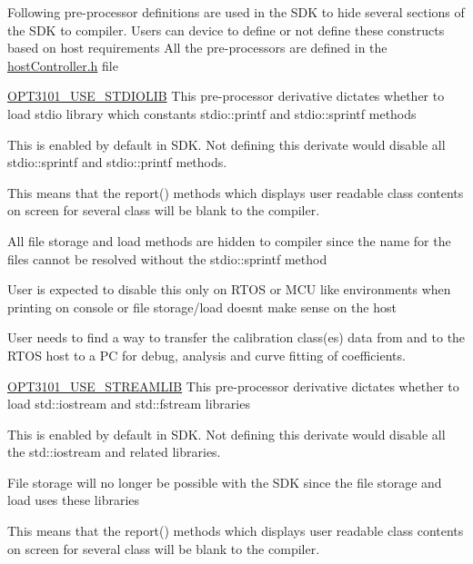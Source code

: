 Following pre-\/processor definitions are used in the S\+DK to hide several sections of the S\+DK to compiler. Users can device to define or not define these constructs based on host requirements All the pre-\/processors are defined in the \mbox{\hyperlink{host_controller_8h}{host\+Controller.\+h}} file
\begin{DoxyItemize}
\item \mbox{\hyperlink{host_controller_8h_a140baa610a82653550ea9aa0a85feb43}{O\+P\+T3101\+\_\+\+U\+S\+E\+\_\+\+S\+T\+D\+I\+O\+L\+IB}} This pre-\/processor derivative dictates whether to load stdio library which constants stdio\+::printf and stdio\+::sprintf methods
\begin{DoxyItemize}
\item This is enabled by default in S\+DK. Not defining this derivate would disable all stdio\+::sprintf and stdio\+::printf methods.
\item This means that the report() methods which displays user readable class contents on screen for several class will be blank to the compiler.
\item All file storage and load methods are hidden to compiler since the name for the files cannot be resolved without the stdio\+::sprintf method
\item User is expected to disable this only on R\+T\+OS or M\+CU like environments when printing on console or file storage/load doesn\textquotesingle{}t make sense on the host
\item User needs to find a way to transfer the calibration class(es) data from and to the R\+T\+OS host to a PC for debug, analysis and curve fitting of coefficients.
\end{DoxyItemize}
\item \mbox{\hyperlink{host_controller_8h_a3ca6673b36debd7f489557558d93fe38}{O\+P\+T3101\+\_\+\+U\+S\+E\+\_\+\+S\+T\+R\+E\+A\+M\+L\+IB}} This pre-\/processor derivative dictates whether to load std\+::iostream and std\+::fstream libraries
\begin{DoxyItemize}
\item This is enabled by default in S\+DK. Not defining this derivate would disable all the std\+::iostream and related libraries.
\item File storage will no longer be possible with the S\+DK since the file storage and load uses these libraries
\item This means that the report() methods which displays user readable class contents on screen for several class will be blank to the compiler.

\end{DoxyItemize}
\end{DoxyItemize}
